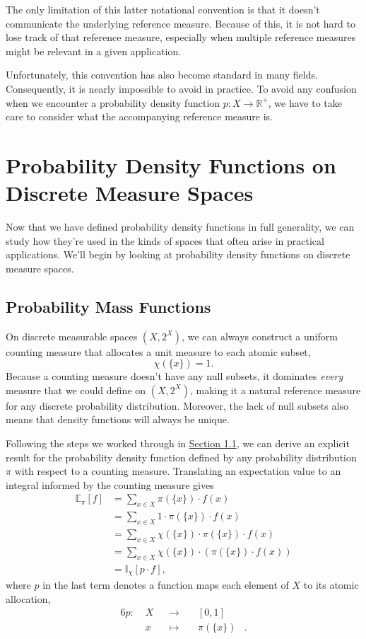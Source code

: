 \documentclass[
  letterpaper,
  DIV=11,
  numbers=noendperiod]{scrartcl}
\begin{document}
The only limitation of this latter notational convention is that it
doesn't communicate the underlying reference measure. Because of this,
it is not hard to lose track of that reference measure, especially when
multiple reference measures might be relevant in a given application.

Unfortunately, this convention has also become standard in many fields.
Consequently, it is nearly impossible to avoid in practice. To avoid any
confusion when we encounter a probability density function
\(p : X \rightarrow \mathbb{R}^{+}\), we have to take care to consider
what the accompanying reference measure is.

\section{Probability Density Functions on Discrete Measure
Spaces}\label{probability-density-functions-on-discrete-measure-spaces}

Now that we have defined probability density functions in full
generality, we can study how they're used in the kinds of spaces that
often arise in practical applications. We'll begin by looking at
probability density functions on discrete measure spaces.

\subsection{Probability Mass
Functions}\label{probability-mass-functions}

On discrete measurable spaces \((X, 2^{X})\), we can always construct a
uniform counting measure that allocates a unit measure to each atomic
subset, \[
\chi( \{ x \} ) = 1.
\] Because a counting measure doesn't have any null subsets, it
dominates \emph{every} measure that we could define on \((X, 2^{X})\),
making it a natural reference measure for any discrete probability
distribution. Moreover, the lack of null subsets also means that density
functions will always be unique.

Following the steps we worked through in
\hyperref[sec:finite_densities]{Section 1.1}, we can derive an explicit
result for the probability density function defined by any probability
distribution \(\pi\) with respect to a counting measure. Translating an
expectation value to an integral informed by the counting measure gives
\begin{align*}
\mathbb{E}_{\pi}[f]
&=
\sum_{x \in X}
\pi( \{ x \} ) \cdot f(x)
\\
&=
\sum_{x \in X}
1 \cdot \pi( \{ x \} ) \cdot f(x)
\\
&=
\sum_{x \in X}
\chi( \{ x \} ) \cdot \pi( \{ x \} ) \cdot f(x)
\\
&=
\sum_{x \in X}
\chi( \{ x \} ) \cdot \left( \pi( \{ x \} ) \cdot f(x) \right)
\\
&=
\mathbb{I}_{\chi} [ p \cdot f ],
\end{align*} where \(p\) in the last term denotes a function maps each
element of \(X\) to its atomic allocation, \begin{alignat*}{6}
p :\; & X & &\rightarrow& \; & [0, 1] &
\\
& x & &\mapsto& & \pi( \{ x \} ) &.
\end{alignat*}
\end{document}
